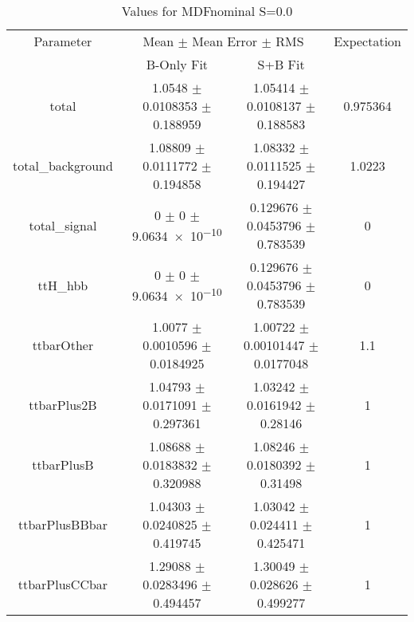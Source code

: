 \begin{table}
\centering
\caption{Values for MDFnominal S=0.0}
\begin{tabular}{cccc}
\toprule
Parameter & \multicolumn{2}{c}{Mean $\pm$ Mean Error $\pm$ RMS} & Expectation\\
 & B-Only Fit & S+B Fit & \\
\midrule
total & \num{1.0548} $\pm$ \num{0.0108353} $\pm$ \num{0.188959} & \num{1.05414} $\pm$ \num{0.0108137} $\pm$ \num{0.188583} & \num{0.975364}\\
total\_background & \num{1.08809} $\pm$ \num{0.0111772} $\pm$ \num{0.194858} & \num{1.08332} $\pm$ \num{0.0111525} $\pm$ \num{0.194427} & \num{1.0223}\\
total\_signal & \num{0} $\pm$ \num{0} $\pm$ \num{9.0634e-10} & \num{0.129676} $\pm$ \num{0.0453796} $\pm$ \num{0.783539} & \num{0}\\
ttH\_hbb & \num{0} $\pm$ \num{0} $\pm$ \num{9.0634e-10} & \num{0.129676} $\pm$ \num{0.0453796} $\pm$ \num{0.783539} & \num{0}\\
ttbarOther & \num{1.0077} $\pm$ \num{0.0010596} $\pm$ \num{0.0184925} & \num{1.00722} $\pm$ \num{0.00101447} $\pm$ \num{0.0177048} & \num{1.1}\\
ttbarPlus2B & \num{1.04793} $\pm$ \num{0.0171091} $\pm$ \num{0.297361} & \num{1.03242} $\pm$ \num{0.0161942} $\pm$ \num{0.28146} & \num{1}\\
ttbarPlusB & \num{1.08688} $\pm$ \num{0.0183832} $\pm$ \num{0.320988} & \num{1.08246} $\pm$ \num{0.0180392} $\pm$ \num{0.31498} & \num{1}\\
ttbarPlusBBbar & \num{1.04303} $\pm$ \num{0.0240825} $\pm$ \num{0.419745} & \num{1.03042} $\pm$ \num{0.024411} $\pm$ \num{0.425471} & \num{1}\\
ttbarPlusCCbar & \num{1.29088} $\pm$ \num{0.0283496} $\pm$ \num{0.494457} & \num{1.30049} $\pm$ \num{0.028626} $\pm$ \num{0.499277} & \num{1}\\
\bottomrule
\end{tabular}
\end{table}
